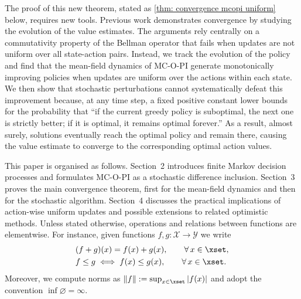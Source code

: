 

The proof of this new theorem, stated as \autoref{thm: convergence mcopi uniform} below, requires new tools. 
Previous work demonstrates convergence by studying the evolution of the value estimates. The arguments rely centrally on a commutativity property of the Bellman operator that fails when updates are not uniform over all state-action pairs.
Instead, we track the evolution of the policy and find that the mean-field dynamics of MC-O-PI generate monotonically improving policies when updates are uniform over the actions within each state.
We then show that stochastic perturbations cannot systematically defeat this improvement because,
at any time step, a fixed positive constant lower bounds for the probability that ``if the current greedy policy is suboptimal, the next one is strictly better; if it is optimal, it remains optimal forever.''
As a result, almost surely, solutions eventually reach the optimal policy and remain there, causing the value estimate to converge to the corresponding optimal action values.



This paper is organised as follows. Section~2 introduces finite Markov decision
processes and formulates MC-O-PI as a stochastic difference inclusion. Section~3 proves the
main convergence theorem, first for the mean-field dynamics and then for the stochastic
algorithm. Section~4 discusses the practical implications of action-wise uniform updates
and possible extensions to related optimistic methods. 
Unless stated otherwise, operations and relations between functions are elementwise. For instance, given functions $f, g : \mathcal X \to \mathcal Y$ we write
\begin{align*}
&(f + g)(x) = f(x) + g(x), \qquad \forall \, x \in \xset ,
    \\
&f \le g \iff f(x) \le g(x), \qquad \forall \, x \in \xset .
\end{align*}
Moreover, we compute norms as $\|f\| := \sup_{x \in \xset} |f(x)|$ 
and adopt the convention $\inf \varnothing = \infty$.


